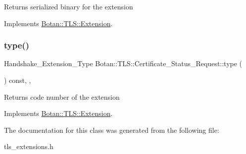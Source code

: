 \begin{DoxyReturn}{Returns}
serialized binary for the extension 
\end{DoxyReturn}


Implements \hyperlink{class_botan_1_1_t_l_s_1_1_extension_a56788726ad2526db54e5a26039cb69db}{Botan\+::\+T\+L\+S\+::\+Extension}.

\mbox{\label{class_botan_1_1_t_l_s_1_1_certificate___status___request_a30a98ada0f7b8cfaec9514794a22f54f}} 
\subsubsection{\texorpdfstring{type()}{type()}}
{\footnotesize\ttfamily Handshake\+\_\+\+Extension\+\_\+\+Type Botan\+::\+T\+L\+S\+::\+Certificate\+\_\+\+Status\+\_\+\+Request\+::type (\begin{DoxyParamCaption}{ }\end{DoxyParamCaption}) const\hspace{0.3cm}{\ttfamily [inline]}, {\ttfamily [override]}, {\ttfamily [virtual]}}

\begin{DoxyReturn}{Returns}
code number of the extension 
\end{DoxyReturn}


Implements \hyperlink{class_botan_1_1_t_l_s_1_1_extension_ac8819b312ce604453225e7b4f7c373ec}{Botan\+::\+T\+L\+S\+::\+Extension}.



The documentation for this class was generated from the following file\+:\begin{DoxyCompactItemize}
\item 
tls\+\_\+extensions.\+h\end{DoxyCompactItemize}
